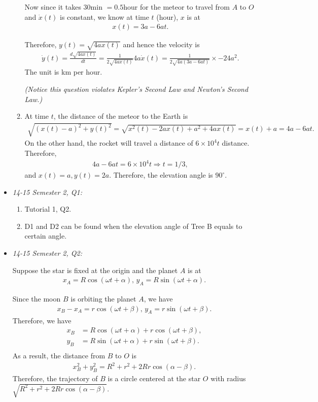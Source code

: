 \documentclass{article}
\begin{document}
\begin{itemize}
\begin{enumerate}[label=(\alph*)]
        Now since it takes $30$min $= 0.5$hour for the meteor to travel from $A$ to $O$ and $\dot x(t)$ is constant, we know at time $t$ (hour), $x$ is at
\begin{align*}
 x(t) = 3a - 6at.
\end{align*}

Therefore, $y(t) = \sqrt{4ax(t)}$ and hence the velocity is
\begin{align*}
  \dot y(t) = \frac{d\sqrt{4ax(t)}}{dt} = \frac{1}{2\sqrt{4ax(t)}} 4a\dot x(t) = \frac{1}{2\sqrt{4a(3a - 6at)}} \times -24a^2.
\end{align*}
The unit is km per hour.

        \emph{(Notice this question violates Kepler's Second Law and Newton's Second Law.)}
      \item At time $t$, the distance of the meteor to the Earth is
\begin{align*}
  \sqrt{(x(t)-a)^2 + y(t)^2} = \sqrt{x^2(t)-2ax(t)+a^2 + 4ax(t)} = x(t) +a = 4a-6at.
\end{align*}
On the other hand, the rocket will travel a distance of $6\times 10^4 t$ distance. Therefore,
\begin{align*}
  4a-6at = 6\times 10^4 t \Rightarrow t = 1/3,
\end{align*}
and $x(t) = a, y(t) = 2a$. Therefore, the elevation angle is $90^\circ$.
      \end{enumerate}

\item \emph{14-15 Semester 2, Q1:}
  \begin{enumerate}[label=(\alph*)]
    \item Tutorial 1, Q2.
      
    \item D1 and D2 can be found when the elevation angle of Tree B equals to certain angle.

    \end{enumerate}
\item \emph{14-15 Semester 2, Q2:}

  Suppose the star is fixed at the origin and the planet $A$ is at
\begin{align*}
  x_A = R\cos (\omega t+\alpha),\,y_A = R \sin (\omega t+ \alpha).
\end{align*}

Since the moon $B$ is orbiting the planet $A$, we have
\begin{align*}
  x_B-x_A = r\cos(\omega t + \beta),\,y_A = r\sin(\omega t + \beta).
\end{align*}
Therefore, we have
\begin{align*}
  x_B &= R\cos (\omega t+ \alpha)+ r \cos (\omega t +\beta),\\
  y_B &= R\sin (\omega t+ \alpha)+ r \sin (\omega t +\beta).\\
\end{align*}
As a result, the distance from $B$ to $O$ is 
\begin{align*}
  x_B^2+y_B^2 = R^2+r^2 +2Rr \cos(\alpha-\beta).
\end{align*}
Therefore, the trajectory of $B$ is a circle centered at the star $O$ with radius $\sqrt{R^2+r^2 + 2Rr\cos(\alpha-\beta)}$.


\end{itemize}
\end{document}
